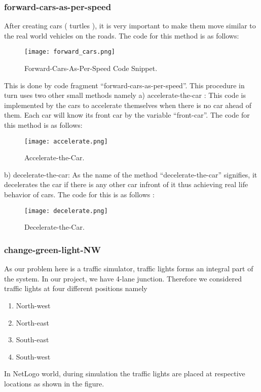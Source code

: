 \documentclass[11pt,a4paper]{article}
\begin{document}
\subsubsection{\textbf{forward-cars-as-per-speed}}

After creating cars ( turtles ), it is very important to make them move similar to the real world vehicles on the roads. The code for this method is as follows:

\begin{figure}[!ht]
\centering
\texttt{[image: forward\_cars.png]}
\caption{\label{fig:fcaps}Forward-Cars-As-Per-Speed Code Snippet.}
\end{figure}

This is done by code fragment “forward-cars-as-per-speed”. This procedure in turn uses two other small methods namely\newline
a)	accelerate-the-car : 
This code is implemented by the cars to accelerate themselves when there is no car ahead of them. Each car will know its front car by the variable “front-car”. The code for this method is as follows:

\begin{figure}[!ht]
\centering
\texttt{[image: accelerate.png]}
\caption{\label{fig:a}Accelerate-the-Car.}
\end{figure}
                                  
b)	decelerate-the-car:
As the name of the method “decelerate-the-car” signifies, it decelerates the car if there is any other car infront of it thus achieving real life behavior of cars. The code for this is as follows :

\begin{figure}[!ht]
\centering
\texttt{[image: decelerate.png]}
\caption{\label{fig:d}Decelerate-the-Car.}
\end{figure}	

\subsubsection{\textbf{change-green-light-NW}}

As our problem here is a traffic simulator, traffic lights forms an integral part of the system. In our project, we have 4-lane junction. Therefore we considered traffic lights at four different positions namely
                     
\begin{enumerate}
\item North-west
\item North-east
\item South-east
\item South-west
\end{enumerate}
In NetLogo world, during simulation the traffic lights are placed at respective locations as shown in the figure.
\end{document}
